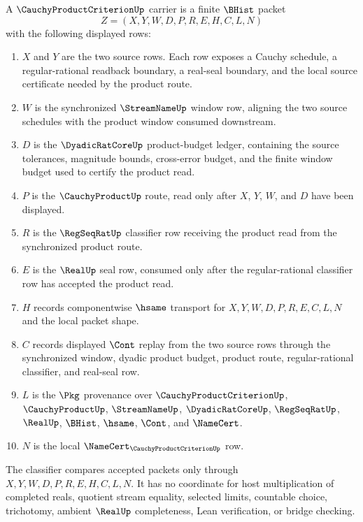 \begin{definition}
\label{def:cauchy-product-criterion-carrier}
A $\CauchyProductCriterionUp$ carrier is a finite $\BHist$ packet
$$
Z=(X,Y,W,D,P,R,E,H,C,L,N)
$$
with the following displayed rows:
\begin{enumerate}
\item $X$ and $Y$ are the two source rows. Each row exposes a Cauchy schedule, a regular-rational readback boundary, a real-seal boundary, and the local source certificate needed by the product route.
\item $W$ is the synchronized $\StreamNameUp$ window row, aligning the two source schedules with the product window consumed downstream.
\item $D$ is the $\DyadicRatCoreUp$ product-budget ledger, containing the source tolerances, magnitude bounds, cross-error budget, and the finite window budget used to certify the product read.
\item $P$ is the $\CauchyProductUp$ route, read only after $X$, $Y$, $W$, and $D$ have been displayed.
\item $R$ is the $\RegSeqRatUp$ classifier row receiving the product read from the synchronized product route.
\item $E$ is the $\RealUp$ seal row, consumed only after the regular-rational classifier row has accepted the product read.
\item $H$ records componentwise $\hsame$ transport for $X,Y,W,D,P,R,E,C,L,N$ and the local packet shape.
\item $C$ records displayed $\Cont$ replay from the two source rows through the synchronized window, dyadic product budget, product route, regular-rational classifier, and real-seal row.
\item $L$ is the $\Pkg$ provenance over $\CauchyProductCriterionUp$, $\CauchyProductUp$, $\StreamNameUp$, $\DyadicRatCoreUp$, $\RegSeqRatUp$, $\RealUp$, $\BHist$, $\hsame$, $\Cont$, and $\NameCert$.
\item $N$ is the local $\NameCert_{\CauchyProductCriterionUp}$ row.
\end{enumerate}
The classifier compares accepted packets only through $X,Y,W,D,P,R,E,H,C,L,N$. It has no coordinate for host multiplication of completed reals, quotient stream equality, selected limits, countable choice, trichotomy, ambient $\RealUp$ completeness, Lean verification, or bridge checking.
\end{definition}

